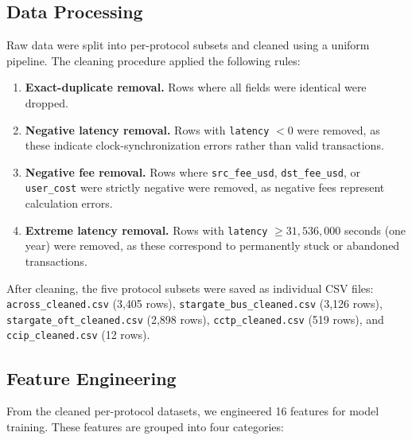 \subsection{Data Processing}

Raw data were split into per-protocol subsets and cleaned using a uniform pipeline. The cleaning procedure applied the following rules:

\begin{enumerate}
    \item \textbf{Exact-duplicate removal.} Rows where all fields were identical were dropped.
    \item \textbf{Negative latency removal.} Rows with \texttt{latency} $< 0$ were removed, as these indicate clock-synchronization errors rather than valid transactions.
    \item \textbf{Negative fee removal.} Rows where \texttt{src\_fee\_usd}, \texttt{dst\_fee\_usd}, or \texttt{user\_cost} were strictly negative were removed, as negative fees represent calculation errors.
    \item \textbf{Extreme latency removal.} Rows with \texttt{latency} $\geq 31{,}536{,}000$ seconds (one year) were removed, as these correspond to permanently stuck or abandoned transactions.
\end{enumerate}

After cleaning, the five protocol subsets were saved as individual CSV files: \texttt{across\_cleaned.csv} (3{,}405 rows), \texttt{stargate\_bus\_cleaned.csv} (3{,}126 rows), \texttt{stargate\_oft\_cleaned.csv} (2{,}898 rows), \texttt{cctp\_cleaned.csv} (519 rows), and \texttt{ccip\_cleaned.csv} (12 rows).

\subsection{Feature Engineering}\label{sec:feature_eng}

From the cleaned per-protocol datasets, we engineered 16 features for model training. These features are grouped into four categories:

